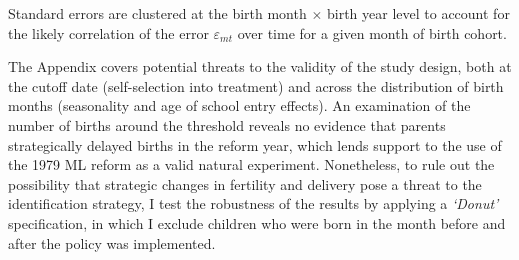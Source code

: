 
Standard errors are clustered at the birth month $\times$ birth year level to account for the likely correlation of the error $\varepsilon_{mt}$ over time for a given month of birth cohort.



The Appendix covers potential threats to the validity of the study design, both at the cutoff date (self-selection into treatment) and across the distribution of birth months (seasonality and age of school entry effects). An examination of the number of births around the threshold reveals no evidence that parents strategically delayed births in the reform year, which lends support to the use of the 1979 ML reform as a valid natural experiment. Nonetheless, to rule out the possibility that strategic changes in fertility and delivery pose a threat to the identification strategy, I test the robustness of the results by applying a \textit{`Donut'} specification, in which I exclude children who were born in the month before and after the policy was implemented.
 


	














